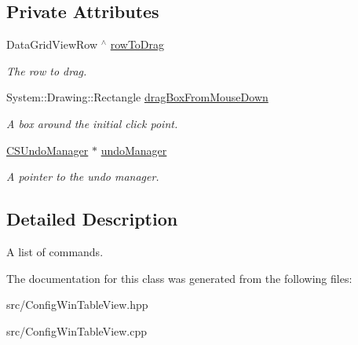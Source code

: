 \subsection*{Private Attributes}
\begin{DoxyCompactItemize}
\item 
\mbox{\label{classConfigWinTableView_a17e877f059f696a751ee9e765c699b16}} 
Data\+Grid\+View\+Row $^\wedge$ \hyperlink{classConfigWinTableView_a17e877f059f696a751ee9e765c699b16}{row\+To\+Drag}
\begin{DoxyCompactList}\small\item\em The row to drag. \end{DoxyCompactList}\item 
\mbox{\label{classConfigWinTableView_a4e0a1429fe25686c0d458dd444593ced}} 
System\+::\+Drawing\+::\+Rectangle \hyperlink{classConfigWinTableView_a4e0a1429fe25686c0d458dd444593ced}{drag\+Box\+From\+Mouse\+Down}
\begin{DoxyCompactList}\small\item\em A box around the initial click point. \end{DoxyCompactList}\item 
\mbox{\label{classConfigWinTableView_ac99d78aaac737402e3ef047597bb77fa}} 
\hyperlink{classCSUndoManager}{C\+S\+Undo\+Manager} $\ast$ \hyperlink{classConfigWinTableView_ac99d78aaac737402e3ef047597bb77fa}{undo\+Manager}
\begin{DoxyCompactList}\small\item\em A pointer to the undo manager. \end{DoxyCompactList}\end{DoxyCompactItemize}


\subsection{Detailed Description}
A list of commands. 

The documentation for this class was generated from the following files\+:\begin{DoxyCompactItemize}
\item 
src/Config\+Win\+Table\+View.\+hpp\item 
src/Config\+Win\+Table\+View.\+cpp\end{DoxyCompactItemize}
